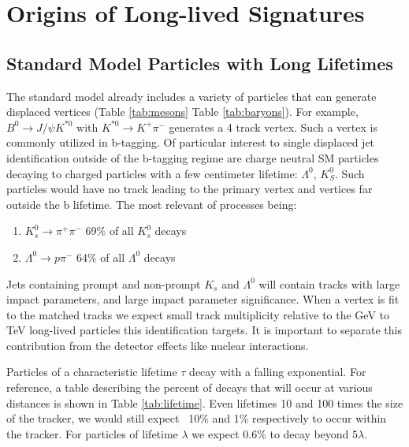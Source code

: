 {%

\section{Origins of Long-lived Signatures}

\subsection{Standard Model Particles with Long Lifetimes}

The standard model already includes a variety of particles that can generate displaced vertices (Table \ref{tab:mesons} Table \ref{tab:baryons}). 
For example, $B^0 \rightarrow J/\psi K^{*0}$ with $K^{*0} \rightarrow K^+\pi^-$ generates a 4 track vertex. Such a vertex is commonly utilized 
in b-tagging. Of particular interest to single displaced jet identification outside of the b-tagging regime are charge neutral SM particles
decaying to charged particles with a few centimeter lifetime: $\Lambda^0$, $K_S^0$. Such particles would have no track
leading to the primary vertex and vertices far outside the b lifetime. The most relevant of processes being:

\begin{enumerate}
\item $K_s^0 \rightarrow \pi^+\pi^-$ 69\% of all $K_s^0$ decays 
\item $\Lambda^0 \rightarrow p \pi^-$ 64\% of all $\Lambda^0$ decays 
\end{enumerate}

Jets containing prompt and non-prompt $K_s$ and $\Lambda^0$ will contain tracks with large impact parameters, 
and large impact parameter significance. When a vertex is fit to the matched tracks we expect small track multiplicity relative 
to the GeV to TeV   long-lived particles this identification targets. It is important to separate this contribution from
the detector effects like nuclear interactions.



Particles of a characteristic lifetime $\tau$ decay with a falling exponential. For reference, 
a table describing the percent of decays that will occur at various distances is shown in Table
 \ref{tab:lifetime}. Even lifetimes 10 and 100 times the size of the tracker, we would still expect
~10\% and 1\% respectively to occur within the tracker. For particles  of lifetime $\lambda$ we
expect 0.6\% to decay beyond $5\lambda$. 

}
